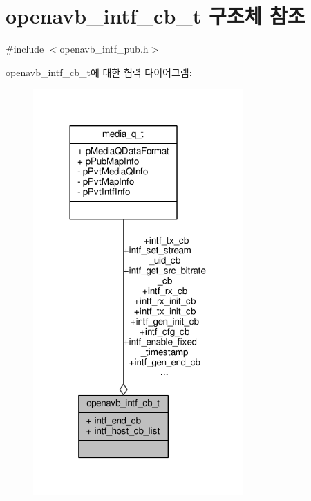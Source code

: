 \hypertarget{structopenavb__intf__cb__t}{}\section{openavb\+\_\+intf\+\_\+cb\+\_\+t 구조체 참조}
\label{structopenavb__intf__cb__t}


{\ttfamily \#include $<$openavb\+\_\+intf\+\_\+pub.\+h$>$}



openavb\+\_\+intf\+\_\+cb\+\_\+t에 대한 협력 다이어그램\+:
\nopagebreak
\begin{figure}[H]
\begin{center}
\leavevmode
\includegraphics[width=228pt]{structopenavb__intf__cb__t__coll__graph}
\end{center}
\end{figure}
